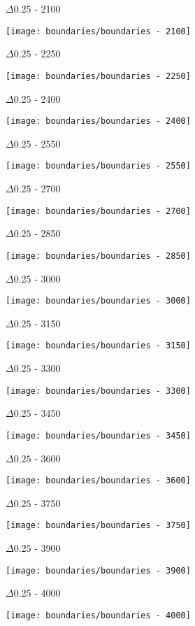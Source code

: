 \begin{enumerate}
\begin{multicols}{3}
\begin{center}
    $\Delta 0.25$ - 2100

    \texttt{[image: boundaries/boundaries - 2100]}

    $\Delta 0.25$ - 2250

    \texttt{[image: boundaries/boundaries - 2250]}

    $\Delta 0.25$ - 2400

    \texttt{[image: boundaries/boundaries - 2400]}

    $\Delta 0.25$ - 2550

    \texttt{[image: boundaries/boundaries - 2550]}

    $\Delta 0.25$ - 2700

    \texttt{[image: boundaries/boundaries - 2700]}

    $\Delta 0.25$ - 2850

    \texttt{[image: boundaries/boundaries - 2850]}

    $\Delta 0.25$ - 3000

    \texttt{[image: boundaries/boundaries - 3000]}

    $\Delta 0.25$ - 3150

    \texttt{[image: boundaries/boundaries - 3150]}

    $\Delta 0.25$ - 3300

    \texttt{[image: boundaries/boundaries - 3300]}

    $\Delta 0.25$ - 3450

    \texttt{[image: boundaries/boundaries - 3450]}

    $\Delta 0.25$ - 3600

    \texttt{[image: boundaries/boundaries - 3600]}

    $\Delta 0.25$ - 3750

    \texttt{[image: boundaries/boundaries - 3750]}

    $\Delta 0.25$ - 3900

    \texttt{[image: boundaries/boundaries - 3900]}

    $\Delta 0.25$ - 4000

    \texttt{[image: boundaries/boundaries - 4000]}
  \end{center}
  \end{multicols}



\end{enumerate}

